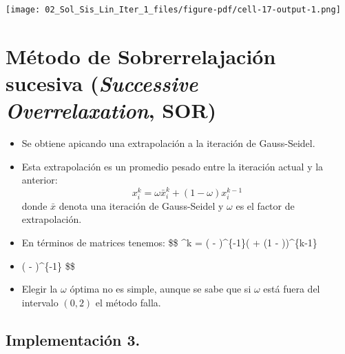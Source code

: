 \documentclass[
  letterpaper,
  DIV=11,
  numbers=noendperiod]{scrreprt}
\begin{document}
\texttt{[image: 02\_Sol\_Sis\_Lin\_Iter\_1\_files/figure-pdf/cell-17-output-1.png]}


\chapter{\texorpdfstring{Método de Sobrerrelajación sucesiva
(\emph{Successive Overrelaxation},
SOR)}{Método de Sobrerrelajación sucesiva (Successive Overrelaxation, SOR)}}\label{muxe9todo-de-sobrerrelajaciuxf3n-sucesiva-successive-overrelaxation-sor}

\begin{itemize}
\item
  Se obtiene apicando una extrapolación a la iteración de Gauss-Seidel.
\item
  Esta extrapolación es un promedio pesado entre la iteración actual y
  la anterior: \[
  x_i^k = \omega \bar{x}_i^k + (1-\omega)x_i^{k-1}
  \] donde \(\bar{x}\) denota una iteración de Gauss-Seidel y \(\omega\)
  es el factor de extrapolación.
\item
  En términos de matrices tenemos: \$\$ \^{}k = ( -
  \omega {})\^{}\{-1\}(\omega {} + (1 -
  \omega ))\^{}\{k-1\}
\item
  \omega ( - \omega {})\^{}\{-1\}  \$\$
\item
  Elegir la \(\omega\) óptima no es simple, aunque se sabe que si
  \(\omega\) está fuera del intervalo \((0,2)\) el método falla.
\end{itemize}

\section{Implementación 3.}\label{implementaciuxf3n-3.}
\end{document}
